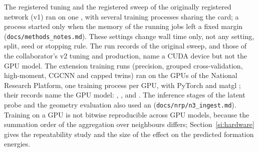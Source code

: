 The registered tuning and the registered sweep of the originally registered network (v1) ran on one
\gpulfortys{}, with several training processes sharing the card; a process started only when the memory of the
running jobs left a fixed margin (\texttt{docs/methods\_notes.md}). These settings change wall time only, not any
setting, split, seed or stopping rule. The run records of the original sweep, and those of the collaborator's v2
tuning and production, name a CUDA device but not the GPU model. The extension training runs (precision, grouped
cross-validation, high-moment, CGCNN and capped twins) ran on the GPUs of the National Research Platform, one
training process per GPU, with PyTorch \vertorch{} and matgl \vermatgl{}; their records name the GPU model:
\gpuaten{}, \gputhreeoh{}, \gpulfour{} and \gpufourty{}. The inference stages of the latent probe and the geometry
evaluation also used an \gputitan{} (\texttt{docs/nrp/n3\_ingest.md}). Training on a GPU is not bitwise
reproducible across GPU models, because the summation order of the aggregation over neighbours differs;
Section~\ref{si:hardware} gives the repeatability study and the size of the effect on the predicted formation
energies.
